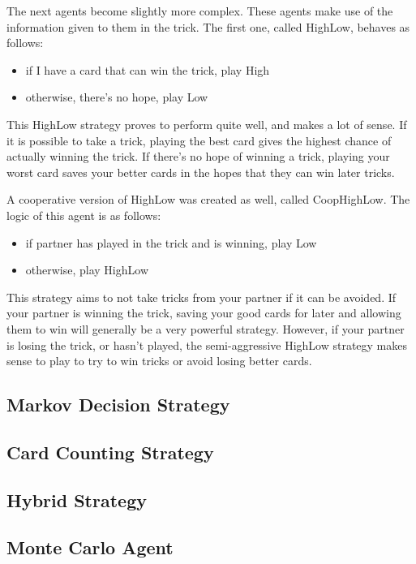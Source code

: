 The next agents become slightly more complex. These agents make use of the information given to them in the trick. The first one,
called HighLow, behaves as follows:
\begin{itemize}[noitemsep, label={}]
    \item if I have a card that can win the trick, play High
    \item otherwise, there's no hope, play Low
\end{itemize}
This HighLow strategy proves to perform quite well, and makes a lot of sense. If it is possible to take a trick, playing the best card
gives the highest chance of actually winning the trick. If there's no hope of winning a trick, playing your worst card
saves your better cards in the hopes that they can win later tricks.

A cooperative version of HighLow was created as well, called CoopHighLow. The logic of this agent is as follows:
\begin{itemize}[noitemsep, label={}]
    \item if partner has played in the trick and is winning, play Low
    \item otherwise, play HighLow
\end{itemize}
This strategy aims to not take tricks from your partner if it can be avoided. If your partner is winning the trick, saving your good cards for
later and allowing them to win will generally be a very powerful strategy. However, if your partner is losing the trick, or hasn't played,
the semi-aggressive HighLow strategy makes sense to play to try to win tricks or avoid losing better cards.


\subsection{Markov Decision Strategy}



\subsection{Card Counting Strategy}



\subsection{Hybrid Strategy}


\subsection{Monte Carlo Agent}

